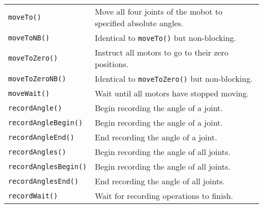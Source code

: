 \begin{table}[!h]
\begin{center}
\begin{tabular}{p{48 mm}p{110 mm}}
\texttt{moveTo()} & Move all four joints of the mobot to specified absolute angles. \\
\texttt{moveToNB()} & Identical to \texttt{moveTo()} but non-blocking. \\
\texttt{moveToZero()} & Instruct all motors to go to their zero positions. \\
\texttt{moveToZeroNB()} & Identical to \texttt{moveToZero()} but non-blocking. \\
\texttt{moveWait()} & Wait until all motors have stopped moving. \\
\texttt{recordAngle()} & Begin recording the angle of a joint. \\
\texttt{recordAngleBegin()} & Begin recording the angle of a joint. \\
\texttt{recordAngleEnd()} & End recording the angle of a joint. \\
\texttt{recordAngles()} & Begin recording the angle of all joints. \\
\texttt{recordAnglesBegin()} & Begin recording the angle of all joints. \\
\texttt{recordAnglesEnd()} & End recording the angle of all joints. \\
\texttt{recordWait()} & Wait for recording operations to finish. \\
\hline
\end{tabular}
\end{center}
\label{mobilec_api_cbinary}
\end{table}

\addtocounter{table}{-1}

